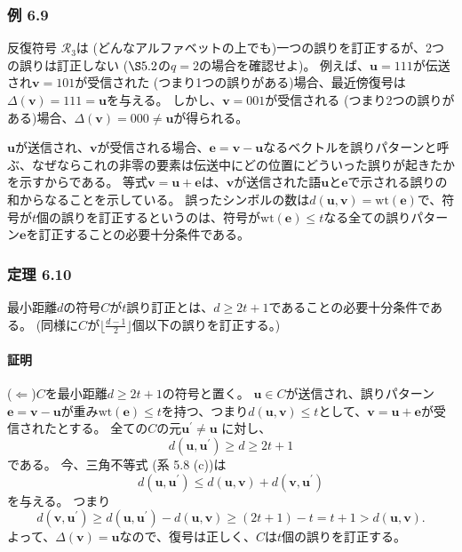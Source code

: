 \documentclass[12pt,a4paper]{article}
\begin{document}
\subsubsection*{例 6.9}

反復符号 $\mathcal{R}_3$は (どんなアルファベットの上でも)一つの誤りを訂正するが、2つの誤りは訂正しない ($\S 5.2$の$q=2$の場合を確認せよ)。
例えば、$\mathbf{u} = 111$が伝送され$\mathbf{v} = 101$が受信された (つまり1つの誤りがある)場合、最近傍復号は$\Delta (\mathbf{v}) = 111 = \mathbf{u}$を与える。
しかし、$\mathbf{v} = 001$が受信される (つまり2つの誤りがある)場合、$\Delta (\mathbf{v}) = 000 \neq \mathbf{u}$が得られる。

$\mathbf{u}$が送信され、$\mathbf{v}$が受信される場合、$\mathbf{e} = \mathbf{v} - \mathbf{u}$なるベクトルを誤りパターンと呼ぶ、なぜならこれの非零の要素は伝送中にどの位置にどういった誤りが起きたかを示すからである。
等式$\mathbf{v} = \mathbf{u} + \mathbf{e}$は、$\mathbf{v}$が送信された語$\mathbf{u}$と$\mathbf{e}$で示される誤りの和からなることを示している。
誤ったシンボルの数は$d(\mathbf{u}, \mathbf{v}) = \text{wt} (\mathbf{e})$で、符号が$t$個の誤りを訂正するというのは、符号が$\text{wt} (\mathbf{e}) \leq t$なる全ての誤りパターン$\mathbf{e}$を訂正することの必要十分条件である。

\subsubsection*{定理 6.10}

最小距離$d$の符号$C$が$t$誤り訂正とは、$d \geq 2t + 1 $であることの必要十分条件である。
(同様に$C$が$\lfloor \frac{d-1}{2} \rfloor$個以下の誤りを訂正する。)

\paragraph{証明}

($\Leftarrow$)$C$を最小距離$d \geq 2t + 1$の符号と置く。
$\mathbf{u} \in C$が送信され、誤りパターン$\mathbf{e} = \mathbf{v} - \mathbf{u}$が重み$\text{wt} (\mathbf{e}) \leq t$を持つ、つまり$d(\mathbf{u}, \mathbf{v}) \leq t$として、$\mathbf{v} = \mathbf{u} + \mathbf{e}$が受信されたとする。
全ての$C$の元$\mathbf{u}^\prime \neq \mathbf{u}$ に対し、
$$
d(\mathbf{u}, \mathbf{u}^\prime) \geq d \geq 2t + 1
$$
である。
今、三角不等式 (系 5.8 (c))は
$$
d(\mathbf{u}, \mathbf{u}^\prime) \leq d(\mathbf{u}, \mathbf{v}) + d(\mathbf{v}, \mathbf{u}^\prime)
$$
を与える。
つまり
$$
d(\mathbf{v}, \mathbf{u}^\prime) \geq d(\mathbf{u}, \mathbf{u}^\prime) - d(\mathbf{u}, \mathbf{v}) \geq (2t + 1) - t = t + 1 > d(\mathbf{u}, \mathbf{v}).
$$
よって、$\Delta (\mathbf{v}) = \mathbf{u}$なので、復号は正しく、$C$は$t$個の誤りを訂正する。
\end{document}
